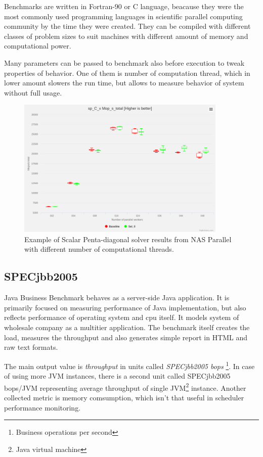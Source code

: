 Benchmarks are written in Fortran-90 or C language, beacause they were the most
commonly used programming languages in scientific parallel computing community
by the time they were created. They can be compiled with different classes of
problem sizes to suit machines with different amount of memory and computational
power.

Many parameters can be passed to benchmark also before execution to tweak
properties of behavior. One of them is number of computation thread, which in
lower amount slowers the run time, but allows to measure behavior of system
without full usage.

\begin{figure}
  \centering
  \includegraphics[width=10cm]{obrazky-figures/nas}
  \caption{Example of Scalar Penta-diagonal solver results from NAS Parallel with
  different number of computational threads.}
\end{figure}

\subsection{SPECjbb2005}
Java Business Benchmark behaves as a server-side Java application. It is primarily focused on measuring performance of Java implementation, but also reflects performance of operating system and cpu itself.
It models system of wholesale company as a multitier application. The benchmark
itself creates the load, measures the throughput and also generates simple
report in HTML and raw text formats.

The main output value is \emph{throughput} in units called \emph{SPECjbb2005
  bops} \footnote{Business operations per second}.
In case of using more JVM instances, there is a second unit called SPECjbb2005
bops/JVM representing average throughput of single JVM\footnote{Java virtual machine} instance.
Another collected metric is memory comsumption, which isn't that useful in
scheduler performance monitoring.

